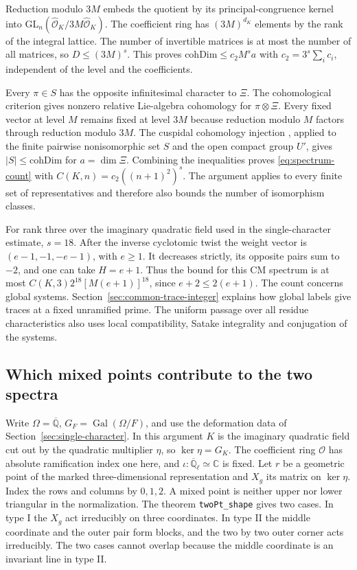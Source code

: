 Reduction modulo $3M$ embeds the quotient by its principal-congruence
kernel into $\mathrm{GL}_n(\widehat{\mathcal O}_K/
3M\widehat{\mathcal O}_K)$. The coefficient ring has
$(3M)^{d_K}$ elements by the rank of the integral lattice. The
number of invertible matrices is at most the number of all matrices,
so $D\le(3M)^s$. This proves
$\mathrm{cohDim}\le c_2 M^s a$ with
$c_2=3^s\sum_i c_i$, independent of the level and the coefficients.

Every $\pi\in S$ has the opposite infinitesimal character to $\Xi$.
The cohomological criterion  gives nonzero relative
Lie-algebra cohomology for $\pi\otimes\Xi$. Every fixed vector at
level $M$ remains fixed at level $3M$ because reduction modulo $M$
factors through reduction modulo $3M$. The cuspidal cohomology
injection , applied to the finite pairwise
nonisomorphic set $S$ and the open compact group $U'$, gives
$|S|\le\mathrm{cohDim}$ for $a=\dim\Xi$. Combining the inequalities
proves \eqref{eq:spectrum-count} with
$C(K,n)=c_2((n+1)^2)^s$. The argument applies to every finite set of
representatives and therefore also bounds the number of isomorphism
classes.

For rank three over the imaginary quadratic field used in the
single-character estimate, $s=18$. After the inverse cyclotomic
twist the weight vector is $(e-1,-1,-e-1)$, with $e\ge1$.
It decreases strictly, its opposite pairs sum to $-2$, and one
can take $H=e+1$. Thus the bound for this CM spectrum is at most
$C(K,3)2^{18}[M(e+1)]^{18}$, since $e+2\le2(e+1)$.
The count concerns global systems. Section~\ref{sec:common-trace-integer}
explains how global labels give traces at a fixed unramified prime.
The uniform passage over all residue characteristics also uses local
compatibility, Satake integrality and conjugation of the systems.

\subsection{Which mixed points contribute to the two spectra}

Write $\Omega=\overline{\mathbb Q}$, $G_F=\operatorname{Gal}(\Omega/F)$,
and use the deformation data of Section~\ref{sec:single-character}.
In this argument $K$ is the imaginary quadratic field cut out by
the quadratic multiplier $\eta$, so $\ker\eta=G_K$. The coefficient
ring $\mathcal O$ has absolute ramification index one here, and
$\iota:\overline{\mathbb Q}_\ell\simeq\mathbb C$ is fixed.
Let $r$ be a geometric point of the marked three-dimensional
representation and $X_g$ its matrix on $\ker\eta$. Index the rows
and columns by $0,1,2$. A mixed point is neither upper nor lower
triangular in the normalization. The theorem \texttt{twoPt\_shape}
gives two cases. In type I the $X_g$ act irreducibly on three
coordinates. In type II the middle coordinate and the outer pair
form blocks, and the two by two outer corner acts irreducibly.
The two cases cannot overlap because the middle coordinate is an
invariant line in type II.

